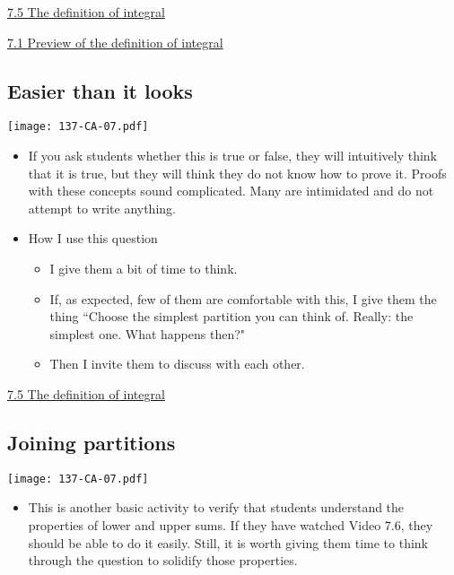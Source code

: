 \documentclass[11pt]{article}
\newcommand{\nl}{\hfill \vspace{-1.1\baselineskip}} %
\newcommand{\vi}{\hspace{8mm} \href{https://www.youtube.com/watch?v=F9lfbCaXOpk&list=PLlwePzQY_wW9vqCkUudCmoOvnNmr9vMuJ&index=1}{7.1 Preview of the definition of integral}}
\newcommand{\vv}{\hspace{8mm} \href{https://www.youtube.com/watch?v=dZ_TWQbksbg&list=PLlwePzQY_wW9vqCkUudCmoOvnNmr9vMuJ&index=5}{7.5 The definition of integral}}
\begin{document}
\begin{videos}
\vv

\vi
\end{videos}

\newpage
\subsection{Easier than it looks}

\begin{center}
{ \texttt{[image: 137-CA-07.pdf]}} 
\end{center}

\begin{comments}
\nl
	\begin{itemize}
		\item  If you ask students whether this is true or false, they will intuitively think that it is true, but they will think they do not know how to prove it.  Proofs with these concepts sound complicated.  Many are intimidated and do not attempt to write anything.
		\item How I use this question
			\begin{itemize}
				\item  I give them a bit of time to think.
				\item  If, as expected, few of them are comfortable with this, I give them the thing ``Choose the simplest partition you can think of.  Really: the simplest one.  What happens then?"
				\item Then I invite them to discuss with each other. 
			\end{itemize}
	\end{itemize}
\end{comments}

\begin{videos}
\vv
\end{videos}

\newpage
\subsection{Joining partitions}

\begin{center}
{ \texttt{[image: 137-CA-07.pdf]}} 
\end{center}

\begin{comments}
\nl
	\begin{itemize}
		\item This is another basic activity to verify that students understand the properties of lower and upper sums.  If they have watched Video 7.6, they should be able to do it easily.  Still, it is worth giving them time to think through the question to solidify those properties.
	\end{itemize}
\end{comments}
\end{document}
